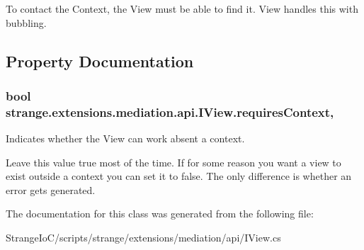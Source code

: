 To contact the Context, the View must be able to find it. View handles this with bubbling. 

\subsection{Property Documentation}
\hypertarget{interfacestrange_1_1extensions_1_1mediation_1_1api_1_1_i_view_a0d9c314f274cd64133a8c97116ba9332}{
\subsubsection[{requires\-Context}]{\setlength{\rightskip}{0pt plus 5cm}bool strange.\-extensions.\-mediation.\-api.\-I\-View.\-requires\-Context\hspace{0.3cm}{\ttfamily [get]}, {\ttfamily [set]}}}\label{interfacestrange_1_1extensions_1_1mediation_1_1api_1_1_i_view_a0d9c314f274cd64133a8c97116ba9332}


Indicates whether the View can work absent a context. 

Leave this value true most of the time. If for some reason you want a view to exist outside a context you can set it to false. The only difference is whether an error gets generated. 

The documentation for this class was generated from the following file\-:\begin{DoxyCompactItemize}
\item 
Strange\-Io\-C/scripts/strange/extensions/mediation/api/I\-View.\-cs\end{DoxyCompactItemize}
